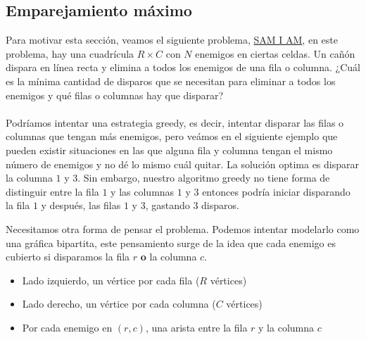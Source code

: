\subsection{Emparejamiento máximo}

Para motivar esta sección, veamos el siguiente problema, \href{https://vjudge.net/problem/UVA-11419}{SAM I AM}, en este problema, hay una cuadrícula $R \times C$ con $N$ enemigos en ciertas celdas. Un cañón dispara en línea recta y elimina a todos los enemigos de una fila o columna. ¿Cuál es la mínima cantidad de disparos que se necesitan para eliminar a todos los enemigos y qué filas o columnas hay que disparar?
\\\\Podríamos intentar una estrategia greedy, es decir, intentar disparar las filas o columnas que tengan más enemigos, pero veámos en el siguiente ejemplo que pueden existir situaciones en las que alguna fila y columna tengan el mismo número de enemigos y no dé lo mismo cuál quitar. La solución optima es disparar la columna $1$ y $3$. Sin embargo, nuestro algoritmo greedy no tiene forma de distinguir entre la fila $1$ y las columnas $1$ y $3$ entonces podría iniciar disparando la fila $1$ y después, las filas $1$ y $3$, gastando $3$ disparos.

\begin{figure}[H]
\centering
{}
\end{figure}

Necesitamos otra forma de pensar el problema. Podemos intentar modelarlo como una gráfica bipartita, este pensamiento surge de la idea que cada enemigo es cubierto si disparamos la fila $r$ \textbf{o} la columna $c$.
 
\begin{itemize}
    \item Lado izquierdo, un vértice por cada fila ($R$ vértices)
    \item Lado derecho, un vértice por cada columna ($C$ vértices)
    \item Por cada enemigo en $(r,c)$, una arista entre la fila $r$ y la columna $c$
\end{itemize}
 
